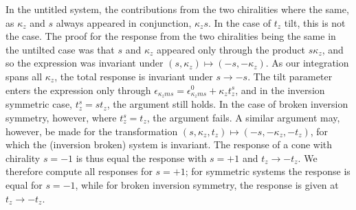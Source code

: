 In the untitled system, the contributions from the two chiralities where the same, as \( \kappa_z \) and \( s \) always appeared in conjunction, \( \kappa_z s \).
In the case of \( t_z \) tilt, this is not the case.
The proof for the response from the two chiralities being the same in the untilted case was that \( s \) and \( \kappa_z \) appeared only through the product \( s \kappa_z \), and so the expression was invariant under \( (s, \kappa_z) \mapsto (-s, -\kappa_z) \).
As our integration spans all \( \kappa_z \), the total response is invariant under \( s \to -s \).
The tilt parameter enters the expression only through \( \epsilon_{\kappa_z m s} = \epsilon_{\kappa_z m s}^0 + \kappa_z t^s_z \), and in the inversion symmetric case, \( t^s_z = s t_z \), the argument still holds.
In the case of broken inversion symmetry, however, where \( t^s_z = t_z \), the argument fails.
A similar argument may, however, be made for the transformation \( (s, \kappa_z, t_z) \mapsto (-s, -\kappa_z, -t_z) \), for which the (inversion broken) system is invariant.
The response of a cone with chirality \( s = -1 \) is thus equal the response with \( s = +1 \) and \( t_z \to -t_z \).
We therefore compute all responses for \( s=+1 \);
for symmetric systems the response is equal for \( s=-1 \), while for broken inversion symmetry, the response is given at \( t_z \to -t_z \).

